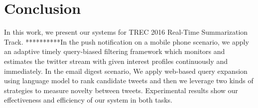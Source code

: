 \section{Conclusion}
In this work, we present our systems for TREC 2016 Real-Time Summarization Track.
**********In the push notification on a mobile phone scenario, 
we apply an adaptive timely query-biased filtering framework which monitors and estimates the twitter stream with given interest profiles continuously and immediately.
In the email digest scenario,
We apply web-based query expansion using language model to rank candidate tweets and then we leverage two kinds of strategies to measure novelty between tweets. Experimental results show our effectiveness and efficiency of our system in both tasks.





